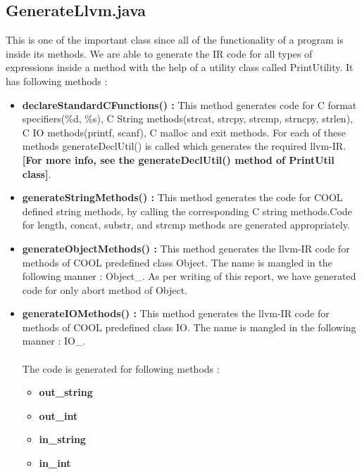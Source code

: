 \documentclass{article}
\begin{document}
\subsection{GenerateLlvm.java}
This is one of the important class since all of the functionality of a program is inside its methods. We are able to generate the IR code for all types of expressions inside a method with the help of a utility class called PrintUtility. It has following methods :
\\
\begin{itemize}

    \item \textbf{declareStandardCFunctions() :} This method generates code for C format specifiers(\%d, \%s), C String methods(strcat, strcpy, strcmp, strncpy, strlen), C IO methods(printf, scanf), C malloc and exit methods. For each of these methods generateDeclUtil() is called which generates the required llvm-IR. \textbf{[For more info, see the generateDeclUtil() method of PrintUtil class]}.
    \item \textbf{generateStringMethods() :} This method generates the code for COOL defined string methods, by calling the corresponding C string methods.Code for length, concat, substr, and strcmp methods are generated appropriately.
    \item \textbf{generateObjectMethods() :} This method generates the llvm-IR code for methods of COOL predefined class Object. The name is mangled in the following manner : Object\_<method-name>. As per writing of this report, we have generated code for only abort method of Object.
    \item \textbf{generateIOMethods() :} This method generates the llvm-IR code for methods of COOL predefined class IO. The name is mangled in the following manner : IO\_<method-name>. \\ \\
    The code is generated for following methods :
    \begin{itemize}
    
        \item \textbf{out\_string}
        \item \textbf{out\_int}
        \item \textbf{in\_string}
        \item \textbf{in\_int}


\end{itemize}
\end{itemize}
\end{document}
